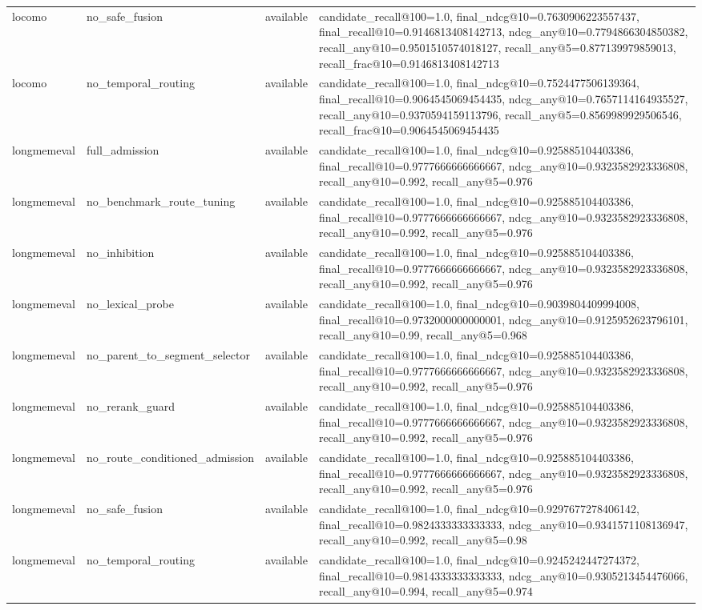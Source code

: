 \begin{tabular}{llll}
locomo & no_safe_fusion & available & candidate_recall@100=1.0, final_ndcg@10=0.7630906223557437, final_recall@10=0.9146813408142713, ndcg_any@10=0.7794866304850382, recall_any@10=0.9501510574018127, recall_any@5=0.877139979859013, recall_frac@10=0.9146813408142713 \\
locomo & no_temporal_routing & available & candidate_recall@100=1.0, final_ndcg@10=0.7524477506139364, final_recall@10=0.9064545069454435, ndcg_any@10=0.7657114164935527, recall_any@10=0.9370594159113796, recall_any@5=0.8569989929506546, recall_frac@10=0.9064545069454435 \\
longmemeval & full_admission & available & candidate_recall@100=1.0, final_ndcg@10=0.925885104403386, final_recall@10=0.9777666666666667, ndcg_any@10=0.9323582923336808, recall_any@10=0.992, recall_any@5=0.976 \\
longmemeval & no_benchmark_route_tuning & available & candidate_recall@100=1.0, final_ndcg@10=0.925885104403386, final_recall@10=0.9777666666666667, ndcg_any@10=0.9323582923336808, recall_any@10=0.992, recall_any@5=0.976 \\
longmemeval & no_inhibition & available & candidate_recall@100=1.0, final_ndcg@10=0.925885104403386, final_recall@10=0.9777666666666667, ndcg_any@10=0.9323582923336808, recall_any@10=0.992, recall_any@5=0.976 \\
longmemeval & no_lexical_probe & available & candidate_recall@100=1.0, final_ndcg@10=0.9039804409994008, final_recall@10=0.9732000000000001, ndcg_any@10=0.9125952623796101, recall_any@10=0.99, recall_any@5=0.968 \\
longmemeval & no_parent_to_segment_selector & available & candidate_recall@100=1.0, final_ndcg@10=0.925885104403386, final_recall@10=0.9777666666666667, ndcg_any@10=0.9323582923336808, recall_any@10=0.992, recall_any@5=0.976 \\
longmemeval & no_rerank_guard & available & candidate_recall@100=1.0, final_ndcg@10=0.925885104403386, final_recall@10=0.9777666666666667, ndcg_any@10=0.9323582923336808, recall_any@10=0.992, recall_any@5=0.976 \\
longmemeval & no_route_conditioned_admission & available & candidate_recall@100=1.0, final_ndcg@10=0.925885104403386, final_recall@10=0.9777666666666667, ndcg_any@10=0.9323582923336808, recall_any@10=0.992, recall_any@5=0.976 \\
longmemeval & no_safe_fusion & available & candidate_recall@100=1.0, final_ndcg@10=0.9297677278406142, final_recall@10=0.9824333333333333, ndcg_any@10=0.9341571108136947, recall_any@10=0.992, recall_any@5=0.98 \\
longmemeval & no_temporal_routing & available & candidate_recall@100=1.0, final_ndcg@10=0.9245242447274372, final_recall@10=0.9814333333333333, ndcg_any@10=0.9305213454476066, recall_any@10=0.994, recall_any@5=0.974 \\
\bottomrule
\end{tabular}
